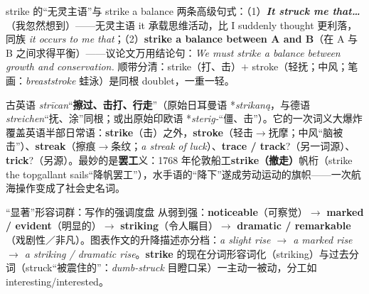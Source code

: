 \documentclass[../main.tex]{subfiles}
\begin{document}

\begin{gram}{strike 的“无灵主语”与 strike a balance}
两条高级句式：（1）\textit{\textbf{It struck me that\dots}}（我忽然想到）——无灵主语 it 承载思维活动，比 I suddenly thought 更利落，同族 \textit{it occurs to me that}；（2）\textbf{strike a balance between A and B}（在 A 与 B 之间求得平衡）——议论文万用结论句：\textit{We must strike a balance between growth and conservation.} 顺带分清：strike（打、击）$+$ stroke（轻抚；中风；笔画：\textit{breaststroke} 蛙泳）是同根 doublet，一重一轻。
\end{gram}

\begin{origin}
古英语 \textit{strīcan}“\textbf{擦过、击打、行走}”（原始日耳曼语 *\textit{strikaną}，与德语 \textit{streichen}“抚、涂”同根；或出原始印欧语 *\textit{sterig-}“僵、击”）。它的一次词义大爆炸覆盖英语半部日常语：\textbf{strike}（击）之外，\textbf{stroke}（轻击$\to$抚摩；中风“脑被击”）、\textbf{streak}（擦痕$\to$条纹；\textit{a streak of luck}）、\textbf{trace / track}?（另一词源）、\textbf{trick}?（另源）。最妙的是\textbf{罢工}义：1768 年伦敦船工\textbf{strike（撤走）}帆桁（strike the topgallant sails“降帆罢工”），水手语的“降下”遂成劳动运动的旗帜——一次航海操作变成了社会史名词。
\end{origin}



\begin{gram}{“显著”形容词群：写作的强调度盘}
从弱到强：\textbf{noticeable}（可察觉）$\to$ \textbf{marked / evident}（明显的）$\to$ \textbf{striking}（令人瞩目）$\to$ \textbf{dramatic / remarkable}（戏剧性／非凡）。图表作文的升降描述亦分档：\textit{a slight rise $\to$ a marked rise $\to$ a striking / dramatic rise}。\textbf{strike} 的现在分词形容词化（striking）与过去分词（struck“被震住的”：\textit{dumb-struck} 目瞪口呆）一主动一被动，分工如 interesting/interested。
\end{gram}
\end{document}
